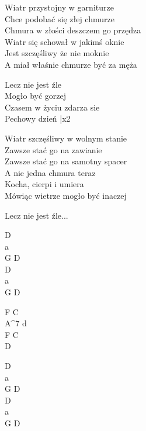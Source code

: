 \begin{text}
    Wiatr przystojny w garniturze\\
    Chce podobać się złej chmurze\\
    Chmura  w złości deszczem go przędza\\
    Wiatr się schował w jakimś oknie\\
    Jest szczęśliwy że nie moknie\\
    A miał właśnie chmurze być za męża

    \vin Lecz nie jest źle\\
    \vin Mogło być gorzej\\
    \vin Czasem w życiu zdarza sie\\
    \vin Pechowy dzień |x2

    Wiatr szczęśliwy w wolnym stanie\\
    Zawsze stać go na zawianie\\
    Zawsze stać go na samotny spacer\\
    A nie jedna chmura teraz\\
    Kocha, cierpi i umiera\\
    Mówiąc wietrze mogło być inaczej
    
    \vin Lecz nie jest źle...
\end{text}
\begin{chord}
    D\\
    a\\
    G D\\
    D\\
    a\\
    G D

    F C\\
    A^7 d\\
    F C\\
    D 

    D\\
    a\\
    G D\\
    D\\
    a\\
    G D
\end{chord}